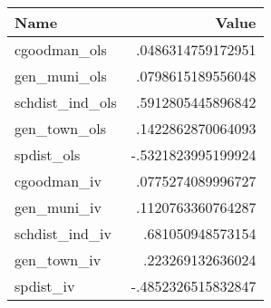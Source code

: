 \begin{tabular}{|l|r|}
\hline
Name & Value \\
\hline
cgoodman_ols & .0486314759172951 \\
gen_muni_ols & .0798615189556048 \\
schdist_ind_ols & .5912805445896842 \\
gen_town_ols & .1422862870064093 \\
spdist_ols & -.5321823995199924 \\
cgoodman_iv & .0775274089996727 \\
gen_muni_iv & .1120763360764287 \\
schdist_ind_iv & .681050948573154 \\
gen_town_iv & .223269132636024 \\
spdist_iv & -.4852326515832847 \\
\end{tabular}
